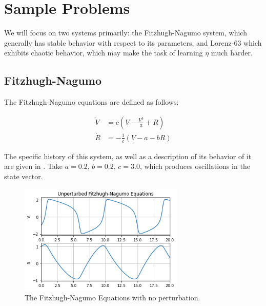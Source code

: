 \documentclass[12pt]{article}
\begin{document}








\section{Sample Problems}

We will focus on two systems primarily: the Fitzhugh-Nagumo system, which generally has stable behavior with respect to its parameters, and Lorenz-63 which exhibits chaotic behavior, which may make the task of learning $\eta$ much harder.


\subsection{Fitzhugh-Nagumo}

The Fitzhugh-Nagumo equations are defined as follows:

\begin{align*}
  \dot{V} &= c \left(V - \frac{V^3}{3} + R \right)\\
  \dot{R} &= -\frac{1}{c} \left( V - a - b R \right)
\end{align*}

The specific history of this system, as well as a description of its behavior of it are given in \cite{ramsay}. Take $a=0.2,\, b=0.2,\, c=3.0$, which produces oscillations in the state vector.

\begin{figure}[ht]
  \centering
  \includegraphics[width=0.7\textwidth]{fn-unperturbed.png}
  \caption{The Fitzhugh-Nagumo Equations with no perturbation.}
\end{figure}
\end{document}
